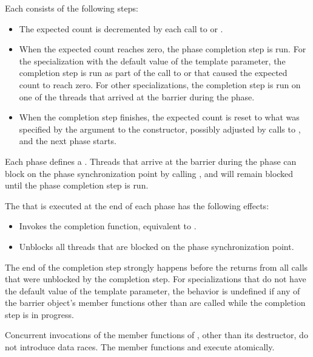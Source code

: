 \pnum
Each  consists of the following steps:
\begin{itemize}
\item
  The expected count is decremented
  by each call to  or .
\item
  When the expected count reaches zero, the phase completion step is run.
  For the specialization
  with the default value of the  template parameter,
  the completion step is run
  as part of the call to  or 
  that caused the expected count to reach zero.
  For other specializations,
  the completion step is run on one of the threads
  that arrived at the barrier during the phase.
\item
  When the completion step finishes,
  the expected count is reset
  to what was specified by the  argument to the constructor,
  possibly adjusted by calls to , and
  the next phase starts.
\end{itemize}

%
\pnum
Each phase defines a .
Threads that arrive at the barrier during the phase
can block on the phase synchronization point by calling , and
will remain blocked until the phase completion step is run.

\pnum
The 
that is executed at the end of each phase has the following effects:
\begin{itemize}
\item Invokes the completion function, equivalent to .
\item Unblocks all threads that are blocked on the phase synchronization point.
\end{itemize}
The end of the completion step strongly happens before
the returns from all calls that were unblocked by the completion step.
For specializations that do not have
the default value of the  template parameter,
the behavior is undefined if any of the barrier object's member functions
other than  are called while the completion step is in progress.

\pnum
Concurrent invocations of the member functions of ,
other than its destructor, do not introduce data races.
The member functions  and 
execute atomically.

